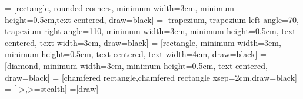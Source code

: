 \usepackage[utf8]{inputenc}
\let\stdthebibliography\thebibliography
\let\endstdthebibliography\endthebibliography
\usepackage{apacite}
\let\thebibliography\stdthebibliography
\let\endthebibliography\endstdthebibliography

\setcounter{secnumdepth}{3} %
\usepackage[T1]{fontenc}
\usepackage[spanish, es-tabla]{babel} %
\decimalpoint  %
\usepackage{mathptmx}
\usepackage{layouts} %
\usepackage{fontspec}
\usepackage{amssymb}
\usepackage{graphicx}
\usepackage{changepage} %
\setmainfont{Arial}
\usepackage{setspace}
\usepackage[left=4 cm,right=3 cm,top=3 cm,bottom=3.5 cm]{geometry}
\usepackage{fancyhdr} %
\pagestyle{fancy} %
\usepackage{lipsum} %
\renewcommand{\labelitemi}{$\bullet$} %
\usepackage{titlesec} %
\usepackage{tocloft} %
\usepackage[colorlinks=true,linkcolor=negro,citecolor = negro]{hyperref}
\usepackage[mathbf=sym]{unicode-math} %
\makeatletter  %
\usepackage{multirow} %
\usepackage{array} %
\usepackage{subcaption} %
\usepackage{tikz} %
\usetikzlibrary{calc,positioning,shapes.geometric,shapes.symbols,shapes.misc,arrows.meta,decorations.pathreplacing}

 = [rectangle, rounded corners, minimum width=3cm, minimum height=0.5cm,text centered, draw=black]
 = [trapezium, trapezium left angle=70, trapezium right angle=110, minimum width=3cm, minimum height=0.5cm, text centered, text width=3cm, draw=black]
 = [rectangle, minimum width=3cm, minimum height=0.5cm, text centered, text width=4cm, draw=black]
 = [diamond, minimum width=3cm, minimum height=0.5cm, text centered, draw=black]
 = [chamfered rectangle,chamfered rectangle xsep=2cm,draw=black]
 = [->,>=stealth]
=[draw]

\usepackage{listings}
\usepackage{color}


